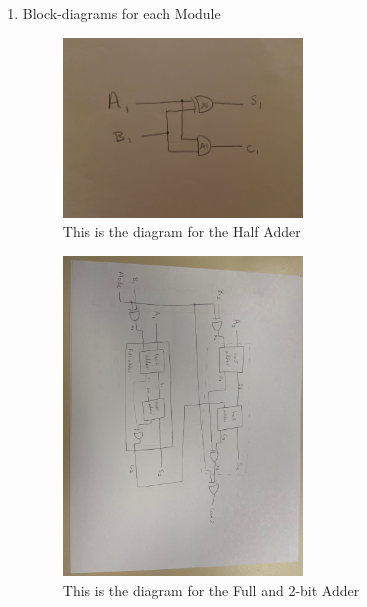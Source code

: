 \documentclass[11pt]{article}
\begin{document}
\begin{enumerate}
\begin{lstlisting}[style=Verilog,
caption=2-bit adder Test Bench Code,
label=2-bit adder_test:ex
]
initial
begin

//Test #1
a1 = 0;
a2 = 0;
b1 = 1;
b2 = 0;
mode = 1;
#10

//Test #2
a1 = 0;
a2 = 0;
b1 = 0;
b2 = 1;
mode = 1;
#10

//Test #3
a1 = 0;
a2 = 0;
b1 = 1;
b2 = 1;
mode = 1;
#10

//Test #4
a1 = 1;
a2 = 0;
b1 = 1;
b2 = 0;
mode = 1;
#10

//Test #5
a1 = 0;
a2 = 1;
b1 = 1;
b2 = 0;
mode = 1;
#10

//Test #6
a1 = 0;
a2 = 1;
b1 = 0;
b2 = 0;
mode = 1;
#10

$finish;
end

endmodule//addsub_test
\end{lstlisting}

	\item Block-diagrams for each Module 

\begin{figure}[ht]\centering
	\includegraphics[width=0.6\textwidth, trim=10cm 10cm 10cm 10cm,clip]{Half-Adder Lab05}
	\caption{This is the diagram for the Half Adder}
	\label{fig:Half-Adder}	
\end{figure}

\begin{figure}[ht]\centering
	\includegraphics[width=0.6\textwidth, trim=3cm 10cm 10cm 10cm,clip]{2-bit Adder Lab05}
	\caption{This is the diagram for the Full and 2-bit Adder}
	\label{fig:Full_2-bit_Adder}	
\end{figure}


\end{enumerate}
\end{document}

